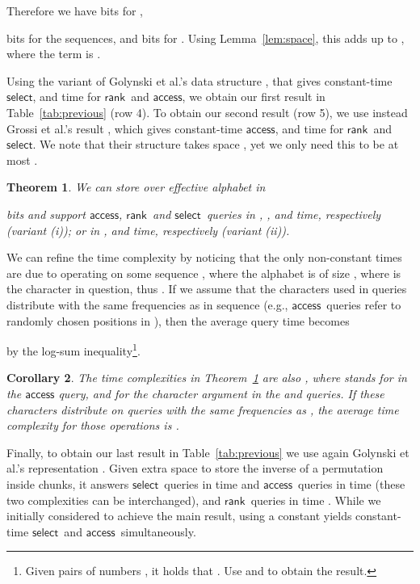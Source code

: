 \documentclass[11pt]{article}
\newtheorem{theorem}{Theorem}
\newtheorem{corollary}[theorem]{Corollary}
\newcommand{\access}
    {\ensuremath{\mathsf{access}}}
\newcommand{\rank}
    {\ensuremath{\mathsf{rank}}}
\newcommand{\select}
    {\ensuremath{\mathsf{select}}}
\begin{document}
\begin{table}[t]
{\begin{tabular}
Therefore we have  bits for , 

bits for the  sequences, and  bits for . Using
Lemma~\ref{lem:space}, this adds up to
, 
where the  term is .

Using the variant of Golynski et al.'s data structure \cite[Thm.~4.2]{GMR06}, 
that gives constant-time \select, and  time for \rank\ and
\access, we obtain our first result in Table~\ref{tab:previous} (row 4). 
To obtain our second result (row 5), we use instead Grossi et al.'s result 
\cite[Cor.~2]{GOR10}, which gives constant-time \access, and 
time for \rank\ and \select. We note that their structure takes space 
, 
yet we only need this to be at most 
.

\begin{theorem} \label{thm:partitioning}
We can store  over effective alphabet  in
 
bits and support \access, \rank\ and \select\ queries in
, , and  time,
respectively (variant (i)); or in
,  and
 time, respectively (variant (ii)).
\end{theorem}

We can refine
the time complexity by noticing that the only non-constant times are due to
operating on some sequence , where the alphabet is of size
, where  is the character
in question, thus . If we
assume that the characters  used in queries distribute with the same
frequencies as in sequence  (e.g., \access\ queries refer to randomly chosen
positions in ), then the average query time becomes 

by the log-sum inequality\footnote{Given  pairs of numbers 
, it holds that .
Use  and  to obtain the result.}.

\begin{corollary} \label{cor:partitioning-avg}
The  time complexities in
Theorem~\ref{thm:partitioning} are also
, where  stands for  in the 
{\access} query, and for the character argument in the 
 and  queries. If these characters  distribute on queries
with the same frequencies as , the average time complexity for those
operations is .
\end{corollary}

Finally, to obtain our last result in Table~\ref{tab:previous} we use again
Golynski et al.'s representation \cite[Thm.~4.2]{GMR06}. Given 
 extra space to store the inverse of a
permutation inside chunks, it answers \select\ queries in time  
and \access\ queries in time  (these two complexities can be
interchanged), and \rank\ queries in time
. While we initially considered
 to achieve the main result, using a constant
 yields constant-time \select\ and \access\ simultaneously.


\end{tabular}}
\end{table}
\end{document}
